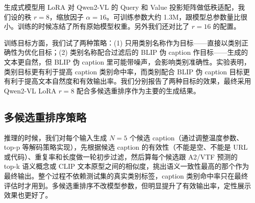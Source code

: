 生成式模型用 LoRA 对 Qwen2-VL 的 Query 和 Value 投影矩阵做低秩适配，我们设的秩 $r=8$，缩放因子 $\alpha=16$。可训练参数大约 1.3M，跟模型总参数量比很小。训练的时候冻结了所有原始模型权重。另外我们还对比了 $r=16$ 的配置。

训练目标方面，我们试了两种策略：(1) 只用类别名称作为目标——直接以类别正确性为优化目标；(2) 类别名称配合过滤后的 BLIP 伪 caption 作目标——生成的文本更自然，但 BLIP 伪 caption 里可能带噪声，会影响类别准确性。实验表明，类别目标更有利于提高 caption 类别命中率，而类别配合 BLIP 伪 caption 目标更有利于提高文本自然度和有效输出率。我们分别报告了两种目标的效果，最终采用 Qwen2-VL LoRA $r=8$ 配合多候选重排序作为主要的生成结果。

\subsection{多候选重排序策略}

推理的时候，我们对每个输入生成 $N=5$ 个候选 caption（通过调整温度参数、top-p 等解码策略实现），先根据候选 caption 的有效性（不能是空、不能是 URL 或代码）、重复率和长度做一轮初步过滤，然后算每个候选跟 A2/VTF 预测的 top-k 语义概念或 CLIP 文本原型之间的相似度，挑出语义一致性最高的那个作为最终输出。整个过程不依赖测试集的真实类别标签，caption 类别命中率只在最终评估时才用到。多候选重排序不改模型参数，但明显提升了有效输出率，定性展示效果也更好了。
